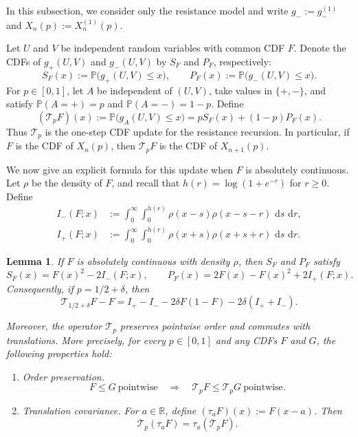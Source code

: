 \documentclass[12pt,preprint]{amsart}
\numberwithin{equation}{section}
\theoremstyle{plain}
\newtheorem{lemma}[theorem]{Lemma}
\theoremstyle{definition}
\newcommand{\Pp}{\mathbb P}
\newcommand{\dd}{\,\mathrm d}
\newcommand{\R}{\mathbb R}
\begin{document}
In this subsection, we consider only the resistance model and write
$g_-:=g_-^{(1)}$ and $X_n(p):=X_n^{(1)}(p)$.

Let $U$ and $V$ be independent random variables with common CDF $F$.  Denote
the CDFs of $g_+(U,V)$ and $g_-(U,V)$ by $S_F$ and $P_F$, respectively:
\[
 S_F(x):=\Pp\bigl(g_+(U,V)\le x\bigr),
 \qquad
 P_F(x):=\Pp\bigl(g_-(U,V)\le x\bigr).
\]
For $p\in[0,1]$, let $A$ be independent of $(U,V)$, take values in
$\{+,-\}$, and satisfy $\Pp(A=+)=p$ and $\Pp(A=-)=1-p$.  Define
\begin{equation}
 (\mathcal T_pF)(x):=\Pp\bigl(g_A(U,V)\le x\bigr)
 =pS_F(x)+(1-p)P_F(x).
 \label{eq:CDF-operator-definition}
\end{equation}
Thus $\mathcal T_p$ is the one-step CDF update for the resistance recursion.
In particular, if $F$ is the CDF of $X_n(p)$, then $\mathcal T_pF$ is the
CDF of $X_{n+1}(p)$.

We now give an explicit formula for this update when $F$ is absolutely
continuous.  Let $\rho$ be the density of $F$, and recall that
$h(r)=\log(1+e^{-r})$ for $r\ge0$.
Define \[
\begin{aligned}
I_-(F;x)
 &:=\int_0^\infty\int_0^{h(r)}
   \rho(x-s)\rho(x-s-r)\,\dd s\,\dd r,
 \\
 I_+(F;x)
 &:=\int_0^\infty\int_0^{h(r)}
   \rho(x+s)\rho(x+s+r)\,\dd s\,\dd r.
\end{aligned} \]

\begin{lemma}
\label{lem:exact-cdf}
If $F$ is absolutely continuous with density $\rho$, then $S_F$ and $P_F$
satisfy
\begin{equation}
 S_F(x)=F(x)^2-2I_-(F;x),
 \qquad
 P_F(x)=2F(x)-F(x)^2+2I_+(F;x).
 \label{eq:series-parallel-cdf}
\end{equation}
Consequently, if $p=1/2+\delta$, then
\begin{equation}
 \mathcal T_{1/2+\delta}F-F
 =I_+-I_--2\delta F(1-F)-2\delta(I_++I_-).
 \label{eq:exact-cdf-operator}
\end{equation}
\begin{samepage}
Moreover, the operator $\mathcal T_p$ preserves pointwise order and commutes
with translations.  More precisely, for every $p\in[0,1]$ and any CDFs $F$
and $G$, the following properties hold:
\begin{enumerate}
\item[(i)] \emph{Order preservation.}
\[
 F\le G\ \text{pointwise}
 \quad\Longrightarrow\quad
 \mathcal T_pF\le\mathcal T_pG\ \text{pointwise}.
\]
\item[(ii)] \emph{Translation covariance.}  For $a\in\R$, define
$(\tau_aF)(x):=F(x-a)$.  Then
\[
 \mathcal T_p(\tau_aF)=\tau_a(\mathcal T_pF).
\]
\end{enumerate}
\end{samepage}
\end{lemma}
\end{document}
